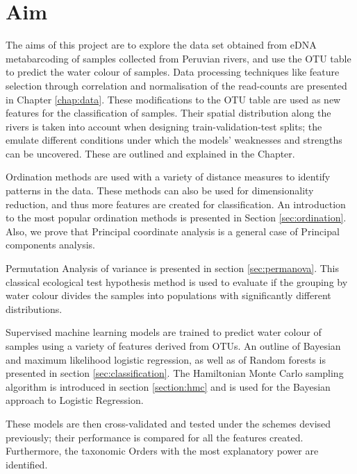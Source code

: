 
\section{Aim}

The aims of this project are to explore the data set obtained from eDNA metabarcoding of samples collected from Peruvian rivers, and use the OTU table to predict the water colour of samples. Data processing techniques like feature selection through correlation and normalisation of the read-counts are presented in Chapter \ref{chap:data}. These modifications to the OTU table are used as new features for the classification of samples. Their spatial distribution along the rivers is taken into account when designing train-validation-test splits; the emulate different conditions under which the models'  weaknesses and strengths can be uncovered. These are outlined and explained in the Chapter.

Ordination methods are used with a variety of distance measures to identify patterns in the data. These methods can also be used for dimensionality reduction, and thus more features are created for classification. An introduction to the most popular ordination methods is presented in Section \ref{sec:ordination}. Also, we prove that Principal coordinate analysis is a general case of Principal components analysis.

 Permutation Analysis of variance  is presented in section \ref{sec:permanova}. This classical ecological test hypothesis method  is used to evaluate if the grouping by water colour divides the samples into populations with significantly different distributions. 

Supervised machine learning models are trained to predict water colour of samples using a variety of features derived from OTUs. An outline of Bayesian and maximum likelihood logistic regression, as well as of Random forests is presented in section \ref{sec:classification}. The Hamiltonian Monte Carlo sampling algorithm is introduced in section \ref{section:hmc} and is used for the Bayesian approach to Logistic Regression. 

These models are then cross-validated and tested under the schemes devised previously;  their performance is compared for all the features created. Furthermore, the taxonomic Orders with the most explanatory power are identified.



